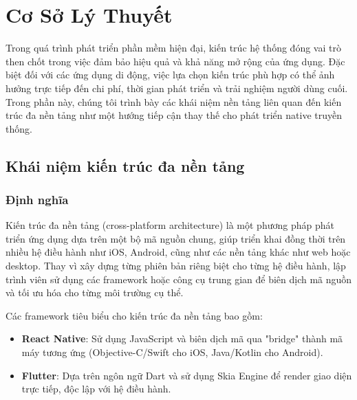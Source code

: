 \section{Cơ Sở Lý Thuyết }
\begin{flushleft}
  \hspace*{0.8cm}Trong quá trình phát triển phần mềm hiện đại, kiến trúc hệ thống đóng vai trò then chốt trong việc đảm bảo hiệu quả và khả năng mở rộng của ứng dụng. Đặc biệt đối với các ứng dụng di động, việc lựa chọn kiến trúc phù hợp có thể ảnh hưởng trực tiếp đến chi phí, thời gian phát triển và trải nghiệm người dùng cuối. Trong phần này, chúng tôi trình bày các khái niệm nền tảng liên quan đến kiến trúc đa nền tảng như một hướng tiếp cận thay thế cho phát triển native truyền thống.
\end{flushleft}
\subsection{Khái niệm kiến trúc đa nền tảng}
\renewcommand{\labelitemi}{--}

\subsubsection{Định nghĩa}
\begin{flushleft}
    \hspace*{0.8cm}Kiến trúc đa nền tảng (cross-platform architecture) là một phương pháp phát triển ứng dụng dựa trên một bộ mã nguồn chung, giúp triển khai đồng thời trên nhiều hệ điều hành như iOS, Android, cũng như các nền tảng khác như web hoặc desktop. Thay vì xây dựng từng phiên bản riêng biệt cho từng hệ điều hành, lập trình viên sử dụng các framework hoặc công cụ trung gian để biên dịch mã nguồn và tối ưu hóa cho từng môi trường cụ thể.
\end{flushleft}

\begin{flushleft}
    \hspace*{0.8cm}Các framework tiêu biểu cho kiến trúc đa nền tảng bao gồm:
    \setlength{\leftmargini}{1.5cm}
    \begin{itemize}
        \item \textbf{React Native}: Sử dụng JavaScript và biên dịch mã qua "bridge" thành mã máy tương ứng (Objective-C/Swift cho iOS, Java/Kotlin cho Android).
        \item \textbf{Flutter}: Dựa trên ngôn ngữ Dart và sử dụng Skia Engine để render giao diện trực tiếp, độc lập với hệ điều hành.
    \end{itemize}
\end{flushleft}

